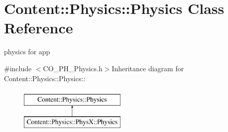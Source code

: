 \hypertarget{classContent_1_1Physics_1_1Physics}{
\section{Content::Physics::Physics Class Reference}
\label{classContent_1_1Physics_1_1Physics}
}


physics for app  


{\ttfamily \#include $<$CO\_\-PH\_\-Physics.h$>$}Inheritance diagram for Content::Physics::Physics::\begin{figure}[H]
\begin{center}
\leavevmode
\includegraphics[height=2cm]{classContent_1_1Physics_1_1Physics}
\end{center}
\end{figure}
